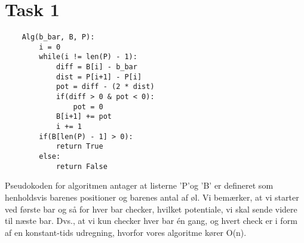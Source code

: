 \section{Task 1}
\begin{lstlisting}
	Alg(b_bar, B, P):
		i = 0
		while(i != len(P) - 1):
			diff = B[i] - b_bar
			dist = P[i+1] - P[i]
			pot = diff - (2 * dist)
			if(diff > 0 & pot < 0):
				pot = 0
			B[i+1] += pot
			i += 1
		if(B[len(P) - 1] > 0):
			return True
		else:
			return False
\end{lstlisting}
Pseudokoden for algoritmen antager at listerne 'P'og 'B' er defineret som henholdsvis barenes positioner og barenes antal af øl.
Vi bemærker, at vi starter ved første bar og så for hver bar checker, hvilket potentiale, vi skal sende videre til næste bar. Dvs., at vi kun checker hver bar én gang, og hvert check er i form af en konstant-tids udregning, hvorfor vores algoritme kører O(n).
